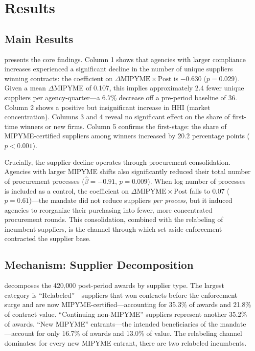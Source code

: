 \documentclass[12pt]{article}
\begin{document}
\section{Results}

\subsection{Main Results}



 presents the core findings. Column 1 shows that agencies with larger compliance increases experienced a significant decline in the number of unique suppliers winning contracts: the coefficient on $\Delta\text{MIPYME} \times \text{Post}$ is $-0.630$ ($p = 0.029$). Given a mean $\Delta$MIPYME of 0.107, this implies approximately 2.4 fewer unique suppliers per agency-quarter---a 6.7\% decrease off a pre-period baseline of 36. Column 2 shows a positive but insignificant increase in HHI (market concentration). Columns 3 and 4 reveal no significant effect on the share of first-time winners or new firms. Column 5 confirms the first-stage: the share of MIPYME-certified suppliers among winners increased by 20.2 percentage points ($p < 0.001$).

Crucially, the supplier decline operates through procurement consolidation. Agencies with larger MIPYME shifts also significantly reduced their total number of procurement processes ($\hat{\beta} = -0.91$, $p = 0.009$). When log number of processes is included as a control, the coefficient on $\Delta\text{MIPYME} \times \text{Post}$ falls to $0.07$ ($p = 0.61$)---the mandate did not reduce suppliers \textit{per process}, but it induced agencies to reorganize their purchasing into fewer, more concentrated procurement rounds. This consolidation, combined with the relabeling of incumbent suppliers, is the channel through which set-aside enforcement contracted the supplier base.

\subsection{Mechanism: Supplier Decomposition}



 decomposes the 420,000 post-period awards by supplier type. The largest category is ``Relabeled''---suppliers that won contracts before the enforcement surge and are now MIPYME-certified---accounting for 35.3\% of awards and 21.8\% of contract value. ``Continuing non-MIPYME'' suppliers represent another 35.2\% of awards. ``New MIPYME'' entrants---the intended beneficiaries of the mandate---account for only 16.7\% of awards and 13.0\% of value. The relabeling channel dominates: for every new MIPYME entrant, there are two relabeled incumbents.
\end{document}
